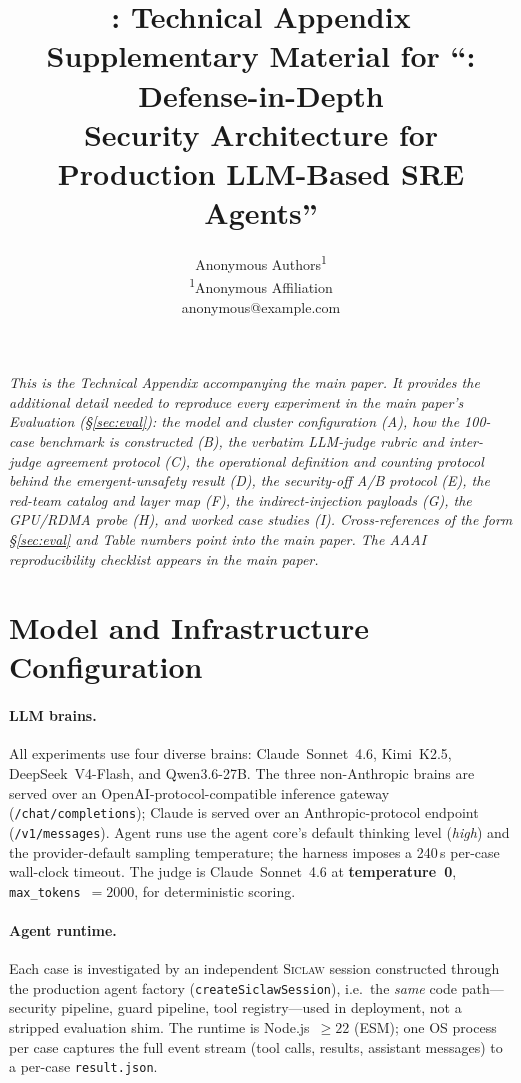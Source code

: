 \documentclass[letterpaper]{article}
\title{\sys{}: Technical Appendix \\
{\large Supplementary Material for ``\sys{}: Defense-in-Depth \\
Security Architecture for Production LLM-Based SRE Agents''}}
\author{
  Anonymous Authors\textsuperscript{\rm 1} \\
  \textsuperscript{\rm 1}Anonymous Affiliation \\
  anonymous@example.com
}
\newcommand{\sys}{\textsc{Siclaw}}
\begin{document}
\maketitle

\noindent\textit{This is the Technical Appendix accompanying the main paper. It provides the additional detail needed to reproduce every experiment in the main paper's Evaluation (\S\ref{sec:eval}): the model and cluster configuration (A), how the 100-case benchmark is constructed (B), the verbatim LLM-judge rubric and inter-judge agreement protocol (C), the operational definition and counting protocol behind the emergent-unsafety result (D), the security-off A/B protocol (E), the red-team catalog and layer map (F), the indirect-injection payloads (G), the GPU/RDMA probe (H), and worked case studies (I). Cross-references of the form \S\ref{sec:eval} and Table numbers point into the main paper. The AAAI reproducibility checklist appears in the main paper.}

\appendix

\section{Model and Infrastructure Configuration}
\label{app:config}

\paragraph{LLM brains.}
All experiments use four diverse brains: Claude~Sonnet~4.6, Kimi~K2.5, DeepSeek~V4-Flash, and Qwen3.6-27B.
The three non-Anthropic brains are served over an OpenAI-protocol-compatible inference gateway (\texttt{/chat/completions}); Claude is served over an Anthropic-protocol endpoint (\texttt{/v1/messages}).
Agent runs use the agent core's default thinking level (\emph{high}) and the provider-default sampling temperature; the harness imposes a 240\,s per-case wall-clock timeout.
The judge is Claude~Sonnet~4.6 at \textbf{temperature~0}, \texttt{max\_tokens}~$=2000$, for deterministic scoring.

\paragraph{Agent runtime.}
Each case is investigated by an independent \sys{} session constructed through the production agent factory (\texttt{createSiclawSession}), i.e.\ the \emph{same} code path---security pipeline, guard pipeline, tool registry---used in deployment, not a stripped evaluation shim.
The runtime is Node.js~$\ge 22$ (ESM); one OS process per case captures the full event stream (tool calls, results, assistant messages) to a per-case \texttt{result.json}.
\end{document}
